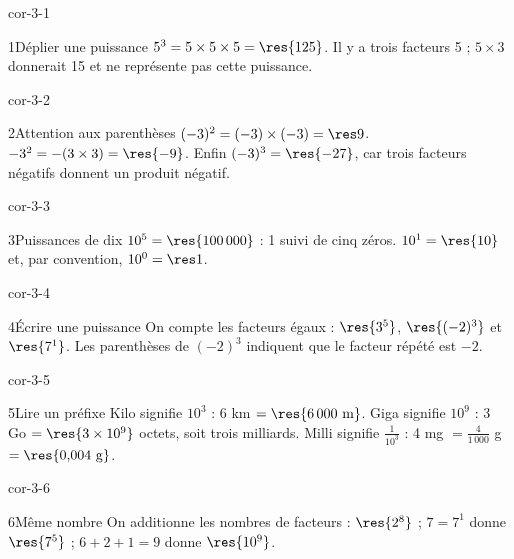 \clearpage\pagestyle{otMain}\setlength{\otBlocEspacement}{2.5mm}\fontsize{11}{15}\selectfont{}
\begin{blocLivre}{cor-3-1}\begin{corrige}{1}{Déplier une puissance}
$5^3=5\times5\times5=\res{125}$. Il y a trois facteurs 5 ; $5\times3$ donnerait 15 et ne représente pas cette puissance.
\end{corrige}\end{blocLivre}
\begin{blocLivre}{cor-3-2}\begin{corrige}{2}{Attention aux parenthèses}
$(-3)^2=(-3)\times(-3)=\res9$. $-3^2=-(3\times3)=\res{-9}$. Enfin $(-3)^3=\res{-27}$, car trois facteurs négatifs donnent un produit négatif.
\end{corrige}\end{blocLivre}
\begin{blocLivre}{cor-3-3}\begin{corrige}{3}{Puissances de dix}
$10^5=\res{100\,000}$ : 1 suivi de cinq zéros. $10^1=\res{10}$ et, par convention, $10^0=\res1$.
\end{corrige}\end{blocLivre}
\begin{blocLivre}{cor-3-4}\begin{corrige}{4}{Écrire une puissance}
On compte les facteurs égaux : $\res{3^5}$, $\res{(-2)^3}$ et $\res{7^1}$. Les parenthèses de $(-2)^3$ indiquent que le facteur répété est $-2$.
\end{corrige}\end{blocLivre}
\begin{blocLivre}{cor-3-5}\begin{corrige}{5}{Lire un préfixe}
Kilo signifie $10^3$ : $6$ km $=\res{6\,000\ \mathrm m}$. Giga signifie $10^9$ : 3 Go $=\res{3\times10^9}$ octets, soit trois milliards. Milli signifie $\frac1{10^3}$ : 4 mg $=\frac4{1\,000}$ g $=\res{0{,}004\ \mathrm g}$.
\end{corrige}\end{blocLivre}
\begin{blocLivre}{cor-3-6}\begin{corrige}{6}{Même nombre}
On additionne les nombres de facteurs : $\res{2^8}$ ; $7=7^1$ donne $\res{7^5}$ ; $6+2+1=9$ donne $\res{10^9}$.
\end{corrige}\end{blocLivre}
